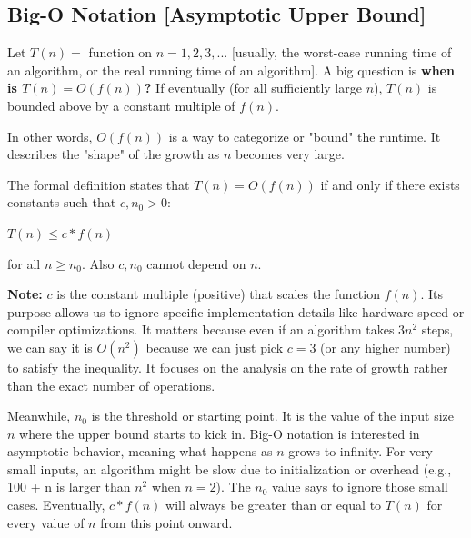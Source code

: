 \documentclass[11pt]{article}
\newenvironment{aside}
  {\begin{mdframed}[style=0,%
      leftline=false,rightline=false,leftmargin=2em,rightmargin=2em,%
          innerleftmargin=0pt,innerrightmargin=0pt,linewidth=0.75pt,%
      skipabove=7pt,skipbelow=7pt]\small}
  {\end{mdframed}}
\begin{document}
\vspace{11pt}
\subsection{Big-O Notation [Asymptotic Upper Bound]}
\vspace{11pt}

Let $T(n)=$ function on $n = 1, 2, 3, ...$ [usually, the worst-case running time of an algorithm, or the real running time of an algorithm]. A big question is \textbf{when is $T(n)=O(f(n))$?} If eventually (for all sufficiently large $n$), $T(n)$ is bounded above by a constant multiple of $f(n)$.

In other words, $O(f(n))$ is a way to categorize or "bound" the runtime. It describes the "shape" of the growth as $n$ becomes very large.
\vspace{11pt}

The formal definition states that $T(n)=O(f(n))$ if and only if there exists constants such that $c, n_0 > 0$:

\vspace{11pt}
\begin{center}
    $T(n) \leq c * f(n)$
\end{center}
\vspace{11pt}

for all $n \geq n_0$. Also $c, n_0$ cannot depend on $n$.

\vspace{11pt}
\begin{aside}
    \textbf{Note:} $c$ is the constant multiple (positive) that scales the function $f(n)$. Its purpose allows us to ignore specific implementation details like hardware speed or compiler optimizations. It matters because even if an algorithm takes $3n^2$ steps, we can say it is $O(n^2)$ because we can just pick $c=3$ (or any higher number) to satisfy the inequality. It focuses on the analysis on the rate of growth rather than the exact number of operations.

    Meanwhile, $n_0$ is the threshold or starting point. It is the value of the input size $n$ where the upper bound starts to kick in. Big-O notation is interested in asymptotic behavior, meaning what happens as $n$ grows to infinity. For very small inputs, an algorithm might be slow due to initialization or overhead (e.g., 100 + n is larger than $n^2$ when $n=2$). The $n_0$ value says to ignore those small cases. Eventually, $c*f(n)$ will always be greater than or equal to $T(n)$ for every value of $n$ from this point onward.
\end{aside}
\vspace{11pt}
\end{document}
